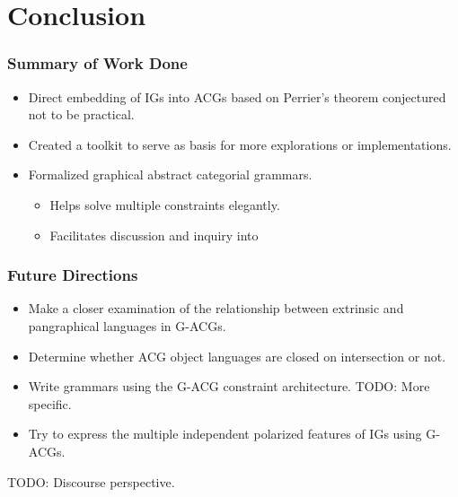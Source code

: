 \documentclass{beamer}
\begin{document}
\section{Conclusion}

\begin{frame}
  \frametitle{Summary of Work Done}

  \begin{itemize}
  \item Direct embedding of IGs into ACGs based on Perrier's theorem
    conjectured not to be practical.
  \item Created a toolkit to serve as basis for more explorations or
    implementations.
  \item Formalized graphical abstract categorial grammars.
    \begin{itemize}
    \item Helps solve multiple constraints elegantly.
    \item Facilitates discussion and inquiry into
    \end{itemize}
  \end{itemize}
\end{frame}


\begin{frame}
  \frametitle{Future Directions}

  \begin{itemize}
  \item Make a closer examination of the relationship between extrinsic
    and pangraphical languages in G-ACGs.
  \item Determine whether ACG object languages are closed on intersection
    or not.
  \item Write grammars using the G-ACG constraint architecture. TODO:
    More specific.
  \item Try to express the multiple independent polarized features of IGs
    using G-ACGs.
  \end{itemize}
TODO: Discourse perspective.
\end{frame}
\end{document}
